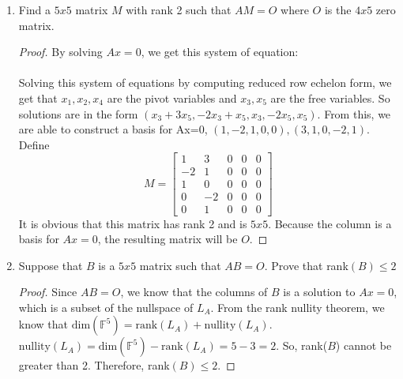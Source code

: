 \documentclass[11pt]{scrartcl}
\begin{document}
\begin{enumerate}[label=\alph*.]
	\item{
		Find a $5x5$ matrix $M$ with rank 2 such that $AM=O$ where $O$ is the $4x5$ zero matrix.
		\begin{proof}
			By solving $Ax=0$, we get this system of equation:\\
			\\
			Solving this system of equations by computing reduced row echelon form, 
			we get that $x_1, x_2, x_4$ are the pivot variables and $x_3, x_5$ are the 
			free variables. So solutions are in the form 
			$(x_3+3x_5,-2x_3+x_5, x_3, -2x_5,x_5)$. From this, we are able to 
			construct a basis for Ax=0, $(1,-2,1,0,0),(3,1,0,-2,1)$.
			Define   
			\[			
				M=
				\left[\begin{array}{ccccc}
				1 &3 & 0 & 0 &0 \\ 
				-2 &1 & 0 & 0 &0 \\ 
				1 &0 & 0 & 0 &0 \\ 
				0 &-2 & 0 & 0 &0 \\ 
				0 &1 & 0 & 0 &0 
				\end{array}\right]	
			\]
			It is obvious that this matrix has rank 2 and is $5x5$. Because the column is a basis for $Ax=0$, the resulting matrix will be $O$.
		\end{proof}
	}
	\item{
		Suppose that $B$ is a $5x5$ matrix such that $AB=O$. Prove that rank$(B) \leq 2$
		\begin{proof}
			Since $AB=O$, we know that the columns of $B$ is a solution to $Ax=0$, which is a subset of the nullspace of $L_A$.
			From the rank nullity theorem, we know that $\text{dim}(\mathbb{F}^5) = \text{rank}(L_A) + \text{nullity}(L_A)$.\\
			$\text{nullity}(L_A) = \text{dim}(\mathbb{F}^5) - \text{rank}(L_A) = 5 - 3 = 2$. So, rank($B$) cannot be greater than 2. 
			Therefore, rank$(B) \leq 2$.
		\end{proof}
	}
\end{enumerate}
\end{document}
